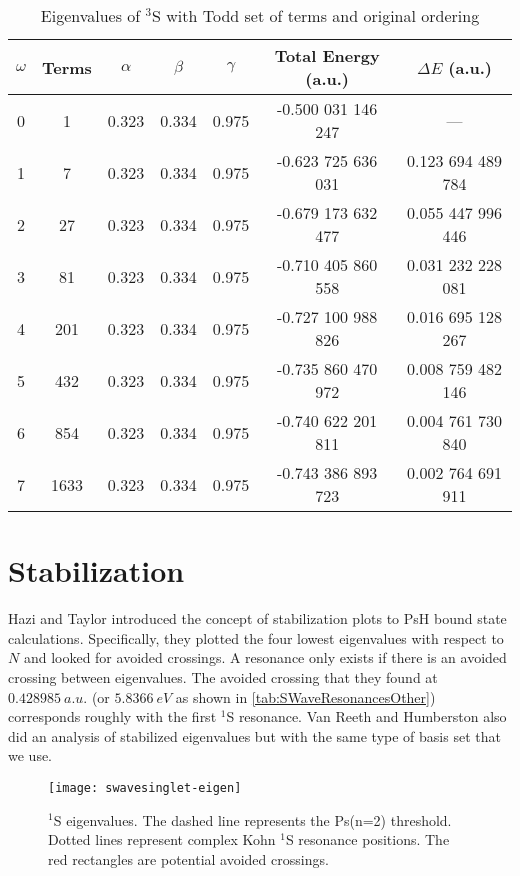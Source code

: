 \documentclass[Dissertation.tex]{subfiles}
\begin{document}
\setlength{\abovecaptionskip}{6pt}   %
\setlength{\belowcaptionskip}{6pt}   %
\begin{table}
\centering
\begin{tabular}{c c c c c c c}
\toprule
$\omega$ & Terms & $\alpha$ & $\beta$ & $\gamma$ & Total Energy (a.u.) & $\Delta E$ (a.u.) \\ [0.5ex]
\midrule
0 & 1    & 0.323 & 0.334 & 0.975 & -0.500 031 146 247 & --- \\
1 & 7    & 0.323 & 0.334 & 0.975 & -0.623 725 636 031 & 0.123 694 489 784 \\
2 & 27   & 0.323 & 0.334 & 0.975 & -0.679 173 632 477 & 0.055 447 996 446 \\
3 & 81   & 0.323 & 0.334 & 0.975 & -0.710 405 860 558 & 0.031 232 228 081 \\
4 & 201  & 0.323 & 0.334 & 0.975 & -0.727 100 988 826 & 0.016 695 128 267 \\
5 & 432  & 0.323 & 0.334 & 0.975 & -0.735 860 470 972 & 0.008 759 482 146 \\
6 & 854  & 0.323 & 0.334 & 0.975 & -0.740 622 201 811 & 0.004 761 730 840 \\
7 & 1633 & 0.323 & 0.334 & 0.975 & -0.743 386 893 723 & 0.002 764 691 911 \\
\bottomrule
\end{tabular}
\caption{Eigenvalues of $^3$S with Todd set of terms and original ordering}
\label{tab:BoundEnergyTodd3}
\end{table}


\section{Stabilization}

Hazi and Taylor \cite{Hazi1970} introduced the concept of stabilization plots 
to PsH bound state calculations.
Specifically, they plotted 
the four lowest eigenvalues with respect to $N$ and looked for avoided 
crossings. A resonance only exists if there is an avoided crossing between 
eigenvalues. The avoided crossing that they found at $\SI{0.428 985}{a.u.}$ (or 
$\SI{5.8366}{eV}$ as shown in \cref{tab:SWaveResonancesOther}) corresponds 
roughly with the first $^1$S resonance. Van Reeth and Humberston \cite{
VanReeth2004} also did an analysis of stabilized eigenvalues but with the 
same type of basis set that we use.

\begin{figure}
	\centering
	\texttt{[image: swavesinglet-eigen]}
	\caption[$^1$S eigenvalues]{$^1$S eigenvalues. The dashed line represents the Ps(n=2) threshold. Dotted lines represent complex Kohn $^1$S resonance positions. The red rectangles are potential avoided crossings.}
	\label{fig:swavesinglet-eigen}
\end{figure}
\end{document}
